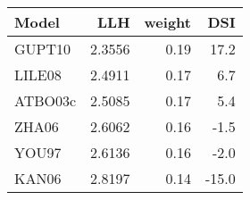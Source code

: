 \begin{tabular}{lrrr}
\toprule
   Model &     LLH &  weight &   DSI \\
\midrule
  GUPT10 &  2.3556 &    0.19 &  17.2 \\
  LILE08 &  2.4911 &    0.17 &   6.7 \\
 ATBO03c &  2.5085 &    0.17 &   5.4 \\
   ZHA06 &  2.6062 &    0.16 &  -1.5 \\
   YOU97 &  2.6136 &    0.16 &  -2.0 \\
   KAN06 &  2.8197 &    0.14 & -15.0 \\
\bottomrule
\end{tabular}
